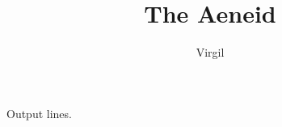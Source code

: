 \documentclass[12pt]{book}
\title{The Aeneid}
\author{Virgil}
\date{}
\newcommand\newchapter[1]{%
}
\newcounter{CurrentLine}
\begin{document}


    \begin{linenumbers}
    \begin{flushleft}
        
    \end{flushleft}
    \end{linenumbers}

    Output  lines.

    \printglossary[type=common]
\end{document}
